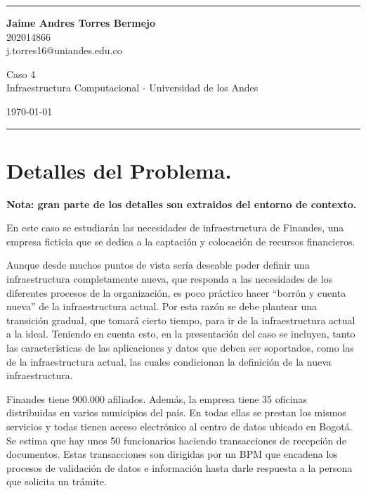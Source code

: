 \documentclass[a4paper]{article}
\begin{document}

\fancyhead[C]{}
\hrule \medskip %
\begin{minipage}{0.295\textwidth} 
\raggedright
\footnotesize
\textbf{Jaime Andres Torres Bermejo} \hfill\\   
202014866\hfill\\
j.torres16@uniandes.edu.co


\end{minipage}
\begin{minipage}{0.4\textwidth} 
\centering 
\large 
Caso 4\\ 
\normalsize 
Infraestructura Computacional - Universidad de los Andes\\ 
\end{minipage}
\begin{minipage}{0.295\textwidth} 
\raggedleft
\today\hfill\\
\end{minipage}
\medskip\hrule 
\bigskip

\section{Detalles del Problema.}

\textbf{Nota: gran parte de los detalles son extraidos del entorno de contexto.}

En este caso se estudiarán las necesidades de infraestructura de Finandes, una empresa ficticia que se dedica a la
captación y colocación de recursos financieros.

Aunque desde muchos puntos de vista sería deseable poder definir una infraestructura completamente nueva, que
responda a las necesidades de los diferentes procesos de la organización, es poco práctico hacer “borrón y cuenta
nueva” de la infraestructura actual. Por esta razón se debe plantear una transición gradual, que tomará cierto
tiempo, para ir de la infraestructura actual a la ideal. Teniendo en cuenta esto, en la presentación del caso se
incluyen, tanto las características de las aplicaciones y datos que deben ser soportados, como las de la
infraestructura actual, las cuales condicionan la definición de la nueva infraestructura.

Finandes tiene 900.000 afiliados. Además, la empresa tiene 35 oficinas distribuidas en varios municipios del país.
En todas ellas se prestan los mismos servicios y todas tienen acceso electrónico al centro de datos ubicado en
Bogotá. Se estima que hay unos 50 funcionarios haciendo transacciones de recepción de documentos. Estas
transacciones son dirigidas por un BPM que encadena los procesos de validación de datos e información hasta darle
respuesta a la persona que solicita un trámite.
\end{document}
